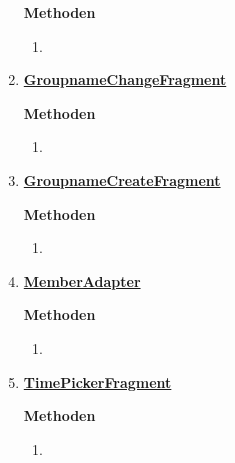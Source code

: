 \begin{enumerate}
	\textbf{Methoden}
	\begin{enumerate}
		\item 
		
	\end{enumerate}
	
	\item \textbf{\underline{GroupnameChangeFragment}}
	
	
	\textbf{Methoden}	
	\begin{enumerate}
		\item 
		
	\end{enumerate}

	\item \textbf{\underline{GroupnameCreateFragment}}
	
	
	\textbf{Methoden}
	
	\begin{enumerate}
		\item 
		
	\end{enumerate}
	\item \textbf{\underline{MemberAdapter}}
	
	
	\textbf{Methoden}
	\begin{enumerate}
		\item 
		
	\end{enumerate}
	\item \textbf{\underline{TimePickerFragment}}
	
	
	\textbf{Methoden}
	\begin{enumerate}
		\item 
		
	\end{enumerate}
\end{enumerate}